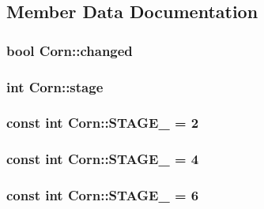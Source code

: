 \subsection{Member Data Documentation}
\hypertarget{classCorn_a1b3eeae171a4920a7816acc8e3d15877}{
\subsubsection[{changed}]{\setlength{\rightskip}{0pt plus 5cm}bool Corn\-::changed}}\label{classCorn_a1b3eeae171a4920a7816acc8e3d15877}
\hypertarget{classCorn_af36e334c7841e04e5e2057e4622efc35}{
\subsubsection[{stage}]{\setlength{\rightskip}{0pt plus 5cm}int Corn\-::stage}}\label{classCorn_af36e334c7841e04e5e2057e4622efc35}
\hypertarget{classCorn_a06dcd52a729fca8910331e6a2fd59224}{
\subsubsection[{S\-T\-A\-G\-E\-\_\-0}]{\setlength{\rightskip}{0pt plus 5cm}const int Corn\-::\-S\-T\-A\-G\-E\-\_ = 2\hspace{0.3cm}{\ttfamily [static]}}}\label{classCorn_a06dcd52a729fca8910331e6a2fd59224}
\hypertarget{classCorn_ac82c4d495b1f3337e56adcde2d44bdba}{
\subsubsection[{S\-T\-A\-G\-E\-\_\-1}]{\setlength{\rightskip}{0pt plus 5cm}const int Corn\-::\-S\-T\-A\-G\-E\-\_ = 4\hspace{0.3cm}{\ttfamily [static]}}}\label{classCorn_ac82c4d495b1f3337e56adcde2d44bdba}
\hypertarget{classCorn_a098322daae5849ac79fb71a39475376d}{
\subsubsection[{S\-T\-A\-G\-E\-\_\-2}]{\setlength{\rightskip}{0pt plus 5cm}const int Corn\-::\-S\-T\-A\-G\-E\-\_ = 6\hspace{0.3cm}{\ttfamily [static]}}}\label{classCorn_a098322daae5849ac79fb71a39475376d}

